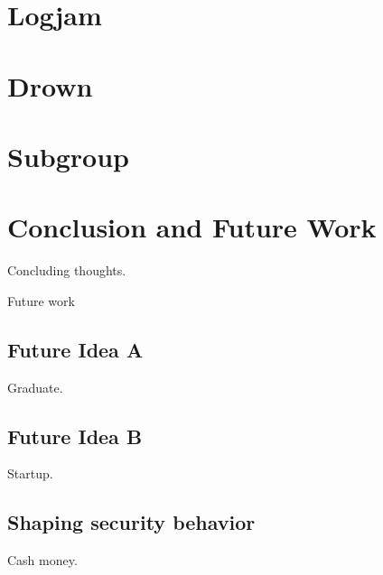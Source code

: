\chapter{Logjam}

\chapter{Drown}

\chapter{Subgroup}


\chapter{Conclusion and Future Work}

Concluding thoughts.

Future work

\section{Future Idea A}
Graduate.

\section{Future Idea B}
Startup.

\section{Shaping security behavior}
Cash money.





